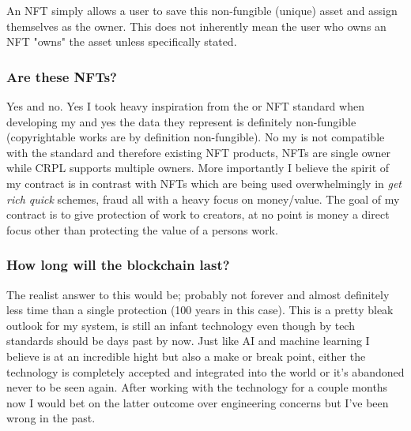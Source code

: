 An NFT  simply allows a user to save this non-fungible (unique) asset and assign themselves as the owner. This does not inherently mean the user who owns an NFT "owns" the asset unless specifically stated.

\subsubsection{Are these NFTs?}

Yes and no.
\br
Yes I took heavy inspiration from the \nft or NFT standard when developing my  and yes the data they represent is definitely non-fungible (copyrightable works are by definition non-fungible).
\br
No my  is not compatible with the \nft standard and therefore existing NFT products, NFTs are single owner while CRPL supports multiple owners. More importantly I believe the spirit of my contract is in contrast with NFTs which are being used overwhelmingly in \textit{get rich quick} schemes, fraud all with a heavy focus on money/value. The goal of my contract is to give protection of work to creators, at no point is money a direct focus other than protecting the value of a persons work. 

\subsubsection{How long will the blockchain last?}

The realist answer to this would be; probably not forever and almost definitely less time than a single  protection (100 years in this case). This is a pretty bleak outlook for my system,  is still an infant technology even though by tech standards should be days past by now. Just like AI and machine learning I believe  is at an incredible hight but also a make or break point, either the technology is completely accepted and integrated into the world or it's abandoned never to be seen again. After working with the technology for a couple months now I would bet on the latter outcome over engineering concerns but I've been wrong in the past.
